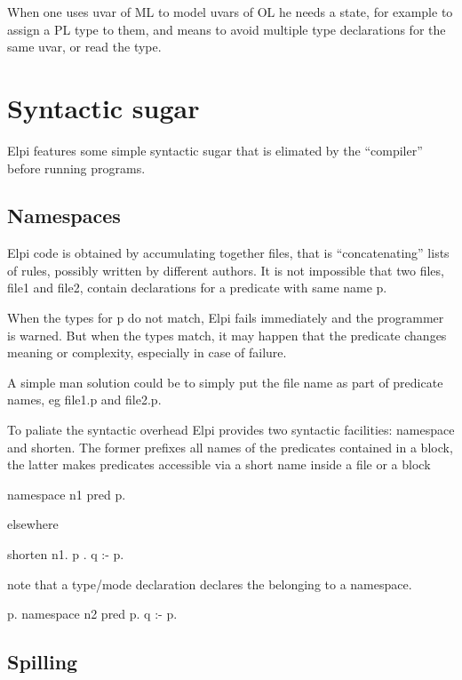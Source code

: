 \documentclass[a4paper, 11pt]{book}
\begin{document}
When one uses uvar of ML to model uvars of OL he needs a state, for example
to assign a PL type to them, and means to avoid multiple type declarations for the same
uvar, or read the type.


\section{Syntactic sugar}

Elpi features some simple syntactic sugar that is elimated by
the ``compiler'' before running programs.

\subsection{Namespaces}

Elpi code is obtained by accumulating together files, that is
``concatenating'' lists of rules, possibly written by different
authors. It is not impossible that
two files, file1 and file2, contain declarations for a predicate with same name p.

When the types for p do not match, Elpi fails immediately
and the programmer is warned. But when the types match, it may
happen that the predicate changes meaning or complexity,
especially in case of failure.

A simple man solution could be to simply put the file name
as part of predicate names, eg file1.p and file2.p.

To paliate the syntactic overhead Elpi provides two syntactic
facilities: namespace and shorten. The former prefixes all
names of the predicates contained in a block, the latter makes
predicates accessible via a short name inside a file or a block

\begin{elpicode}
namespace n1 {
  pred p.
}
\end{elpicode}

elsewhere

\begin{elpicode}
shorten n1.{ p }.
q :- p.
\end{elpicode}

note that a type/mode declaration declares the belonging to a namespace.

\begin{elpicode}
p.
namespace n2 {
  pred p.
  q :- p.
}
\end{elpicode}

\subsection{Spilling}
\end{document}
